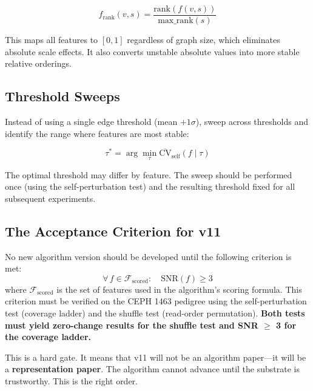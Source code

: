 \documentclass{../yalumba}
\begin{document}
\begin{equation}
  f_{\text{rank}}(v, s) = \frac{\text{rank}(f(v, s))}
                               {\text{max\_rank}(s)}
  \label{eq:rank-norm}
\end{equation}

This maps all features to $[0, 1]$ regardless of graph size, which
eliminates absolute scale effects.  It also converts unstable absolute
values into more stable relative orderings.

\subsection{Threshold Sweeps}

Instead of using a single edge threshold (mean $+ 1\sigma$), sweep
across thresholds and identify the range where features are most stable:

\begin{equation}
  \tau^* = \arg\min_\tau
    \overline{\text{CV}}_{\text{self}}(f \mid \tau)
  \label{eq:threshold-sweep}
\end{equation}

The optimal threshold may differ by feature.  The sweep should be
performed once (using the self-perturbation test) and the resulting
threshold fixed for all subsequent experiments.

\subsection{The Acceptance Criterion for v11}

\begin{keyfinding}
No new algorithm version should be developed until the following
criterion is met:
\begin{equation}
  \forall\, f \in \mathcal{F}_{\text{scored}}: \quad
  \text{SNR}(f) \geq 3
  \label{eq:acceptance}
\end{equation}
where $\mathcal{F}_{\text{scored}}$ is the set of features used in the
algorithm's scoring formula.  This criterion must be verified on the
CEPH 1463 pedigree using the self-perturbation test (coverage ladder)
and the shuffle test (read-order permutation).  \textbf{Both tests must
yield zero-change results for the shuffle test and SNR $\geq$ 3 for the
coverage ladder.}
\end{keyfinding}

This is a hard gate.  It means that v11 will not be an algorithm
paper---it will be a \textbf{representation paper}.  The algorithm
cannot advance until the substrate is trustworthy.  This is the right
order.
\end{document}
